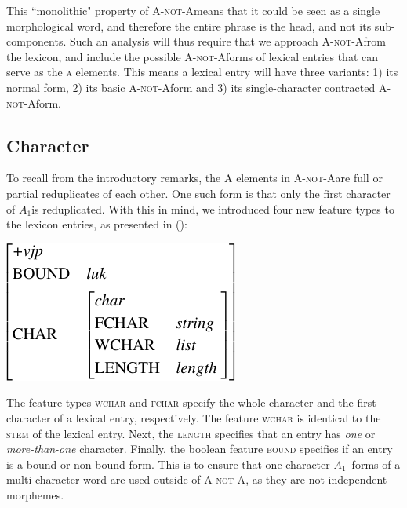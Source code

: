 \documentclass[11pt]{article}
\def\anota{\textsc{A-not-A}}
\def\aone{$A_1$}
\begin{document}
This ``monolithic" property of \anota means that it could be seen as a single morphological word, and therefore the entire phrase is the head, and not its sub-components. Such an analysis will thus require that we approach \anota from the lexicon, and include the possible \anota forms of lexical entries that can serve as the \textsc{a} elements. This means a lexical entry will have three variants: 1) its normal form, 2) its basic \anota form and 3) its single-character contracted \anota form.

\subsection{Character}
\label{ssec:char}

To recall from the introductory remarks, the \textsc{A} elements in \anota are full or partial reduplicates of each other. One such form is that only the first character of \aone is reduplicated. With this in mind, we introduced four new feature types to the lexicon entries, as presented in ():

{\small 
\ex{}
\vspace{-10pt}
\newline
\includegraphics[scale=.8]{pdf/vjp.pdf}
\xe}
\vspace{-20pt}

The feature types \textsc{wchar} and \textsc{fchar} specify the whole character and the first character of a lexical entry, respectively. The feature \textsc{wchar} is identical to the \textsc{stem} of the lexical entry. Next, the \textsc{length} specifies that an entry has \textit{one} or \textit{more-than-one} character. Finally, the boolean feature \textsc{bound} specifies if an entry is a bound or non-bound form. This is to ensure that one-character \aone ~forms of a multi-character word are used outside of \anota, as they are not independent morphemes. 

\end{document}
